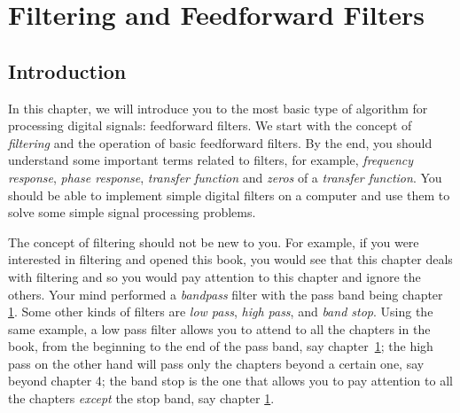 
%
%
%
%
%
%
%

\chapter{Filtering and Feedforward Filters}
\label{ch:filt-intro}

\section{Introduction}

In this chapter, we will introduce you to the most basic type of
algorithm for processing digital signals: feedforward filters. We
start with the concept of \emph{filtering} and the operation of basic
feedforward filters. By the end, you should understand some important
terms related to filters, for example, \emph{frequency response},
\emph{phase response}, \emph{transfer function} and \emph{zeros} of a
\emph{transfer function}. You should be able to implement simple
digital filters on a computer and use them to solve some simple signal
processing problems.

The concept of filtering should not be new to you. For example, if you
were interested in filtering and opened this book, you would see that
this chapter deals with filtering and so you would pay attention to
this chapter and ignore the others.  Your mind performed a
\emph{bandpass} filter with the pass  band
being chapter \ref{ch:filt-intro}.  Some other kinds of filters are
\emph{low pass}, \emph{high pass}, and \emph{band stop}.  Using the
same example, a low pass filter  allows you to
attend to all the chapters in the book, from the beginning to the end
of the pass band, say chapter~\ref{ch:filt-intro}; the high pass on
 the other hand will pass only the chapters
beyond a certain one, say beyond chapter 4; the band stop is the one
 that allows you to pay attention to all the
chapters \emph{except} the stop band, say chapter \ref{ch:filt-intro}.

